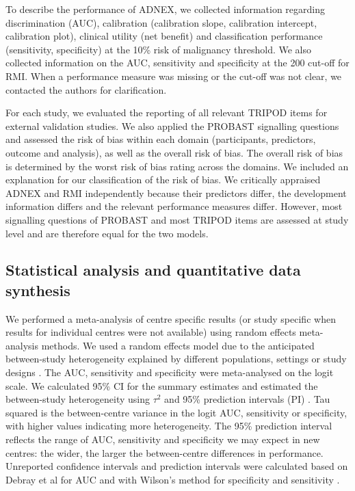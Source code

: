 To describe the performance of \gls{ADNEX}, we collected information regarding
discrimination (\gls{AUC}), calibration (calibration slope, calibration intercept,
calibration plot), clinical utility (net benefit) and classification performance
(sensitivity, specificity) at the 10\% risk of malignancy threshold. We also
collected information on the \gls{AUC}, sensitivity and specificity at the 200 cut-off for
\gls{RMI}. When a performance measure was missing or the cut-off was not clear, we
contacted the authors for clarification.

For each study, we evaluated the reporting of all relevant \gls{TRIPOD} items for external
validation studies. We also applied the \gls{PROBAST} signalling questions and assessed the
risk of bias within each domain (participants, predictors, outcome and analysis), as
well as the overall risk of bias. The overall risk of bias is determined by the worst
risk of bias rating across the domains. We included an explanation for our
classification of the risk of bias. We critically appraised \gls{ADNEX} and \gls{RMI}
independently because their predictors differ, the development information differs
and the relevant performance measures differ. However, most signalling questions of
\gls{PROBAST} and most \gls{TRIPOD} items are assessed at study level and are therefore equal for
the two models.

\subsection{Statistical analysis and quantitative data synthesis}
We performed a meta-analysis of centre specific results (or study specific when
results for individual centres were not available) using random effects meta-analysis
methods. We used a random effects model due to the anticipated between-study
heterogeneity explained by different populations, settings or study designs
 \cite{debrayFrameworkMetaanalysisPrediction2019}. The \gls{AUC}, sensitivity and
specificity were meta-analysed on the logit scale. We calculated 95\% \gls{CI} for the
summary estimates and estimated the between-study heterogeneity using $\tau^2$ and
95\% prediction intervals (\gls{PI})
 \cite{inthoutHartungKnappSidikJonkmanMethodRandom2014,rileyInterpretationRandomEffects2011}.
Tau squared is the between-centre variance in the logit \gls{AUC}, sensitivity or
specificity, with higher values indicating more heterogeneity. The 95\% prediction
interval reflects the range of \gls{AUC}, sensitivity and specificity we may expect in new
centres: the wider, the larger the between-centre differences in performance.
Unreported confidence intervals and prediction intervals were calculated based on
Debray et al \cite{debrayFrameworkMetaanalysisPrediction2019} for \gls{AUC} and with
Wilson's method for specificity and sensitivity
 \cite{debrayFrameworkMetaanalysisPrediction2019,wilsonProbableInferenceLaw1927}.

